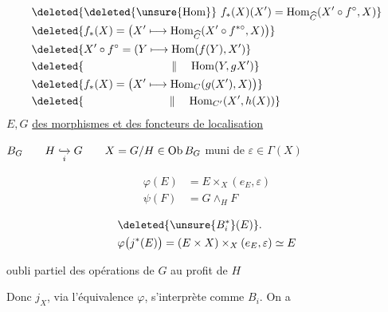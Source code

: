 \[\begin{aligned}&\deleted{\deleted{\unsure{\operatorname{Hom}}}\ f_*(X)(X')=\operatorname{Hom}_{\widehat C}(X'\circ f^{\circ},X)}\\&\deleted{f_*(X)=\bigl(X'\longmapsto\operatorname{Hom}_{\widehat C}(X'\circ f^{*\circ},X)\bigr)}\\&\deleted{X'\circ f^\circ=(Y\longmapsto\operatorname{Hom}(f(Y),X')}\\&\deleted{\hphantom{X'\circ f^\circ=(Y\longmapsto}\parallel\quad\operatorname{Hom}(Y,gX')}\\&\deleted{f_*(X)=\bigl(X'\longmapsto\operatorname{Hom}_C(g(X'),X)\bigr)}\\&\deleted{\hphantom{f_*(X)=(X'\longmapsto}\parallel\quad\operatorname{Hom}_{C'}(X',h(X))}\end{aligned}\]
$E,G$ \hfill \uline{ des morphismes et des foncteurs de localisation}

$B_G\qquad H\lhook\joinrel\xrightarrow[i]{}G\qquad X=G/H\in\mathrm{Ob}\,B_G$ muni de $\varepsilon\in\Gamma(X)$



\[\begin{aligned}\varphi(E)&=E\times_X(e_E,\varepsilon)\\\psi(F)&=G\wedge_H F\end{aligned}\]

\[\begin{aligned}&\deleted{\unsure{B_i^*}(E)}.\\&\varphi\bigl(j^*(E)\bigr)=(E\times X)\times_X(e_E,\varepsilon)\simeq E\end{aligned}\]

oubli partiel des opérations de $G$ au profit de $H$

Donc $j_X$, via l'équivalence $\varphi$, s'interprète comme $B_i$. On a


